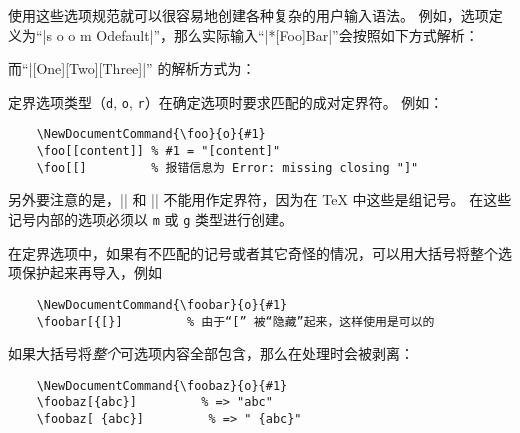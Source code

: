 \documentclass{l3doc}
\begin{document}
%
使用这些选项规范就可以很容易地创建各种复杂的用户输入语法。
例如，选项定义为“|s o o m O{default}|”，那么实际输入“|*[Foo]{Bar}|”会按照如下方式解析：
而“|[One][Two]{}[Three]|” 的解析方式为：

%
定界选项类型（\texttt{d}, \texttt{o}, \texttt{r}）在确定选项时要求匹配的成对定界符。
例如：
\begin{verbatim}
    \NewDocumentCommand{\foo}{o}{#1}
    \foo[[content]] % #1 = "[content]"
    \foo[[]         % 报错信息为 Error: missing closing "]"
\end{verbatim}
另外要注意的是，|{| 和 |}| 不能用作定界符，因为在 \TeX{} 中这些是组记号。
在这些记号内部的选项必须以 \texttt{m} 或 \texttt{g} 类型进行创建。

%
在定界选项中，如果有不匹配的记号或者其它奇怪的情况，可以用大括号将整个选项保护起来再导入，例如
\begin{verbatim}
    \NewDocumentCommand{\foobar}{o}{#1}
    \foobar[{[}]         % 由于“[” 被“隐藏”起来，这样使用是可以的
\end{verbatim}
 如果大括号将\emph{整个}可选项内容全部包含，那么在处理时会被剥离：
\begin{verbatim}
    \NewDocumentCommand{\foobaz}{o}{#1}
    \foobaz[{abc}]         % => "abc"
    \foobaz[ {abc}]         % => " {abc}"
\end{verbatim}
\end{document}

